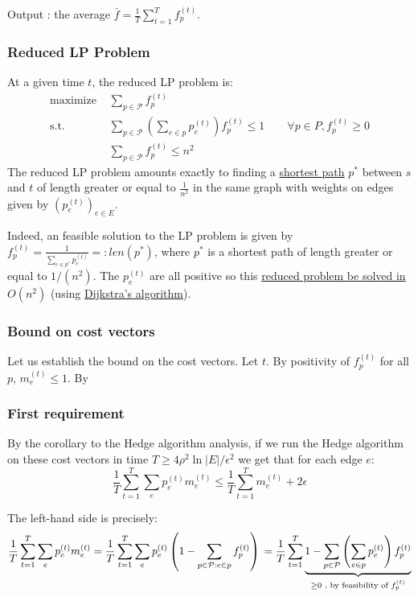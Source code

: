 \documentclass[a4paper, 11pt]{article}
\begin{document}
Output : the average $\bar{f} = \frac{1}{T}\sum_{t = 1}^{T}f_p^{(t)}$.

\subsubsection*{Reduced LP Problem}

At a given time $t$, the reduced LP problem is:
\begin{align*}
    \text{maximize }&\sum_{p \in \mathcal{P}} f_p^{(t)} \\
    \text{s.t. }&\sum_{p \in \mathcal{P}} \left(\sum_{e \in p} p_e^{(t)}\right)f_p^{(t)} \le 1 \qquad
\forall p \in P, f_p^{(t)} \ge 0 \\
    &\sum_{p \in \mathcal{P}}f_p^{(t)} \le n^2
\end{align*}
The reduced LP problem amounts exactly to finding a \ul{shortest path} $p^*$ between $s$ and $t$ of length greater or equal to $\frac{1}{n^2}$ in the same graph with weights on edges given by $(p_e^{(t)})_{e\in E}$.

Indeed, an feasible solution to the LP problem is given by $f_{p}^{(t)} = \frac{1}{\sum_{e \in p^*} p_e^{(t)}} =: len(p^*)$, where $p^*$ is a shortest path of length greater or equal to $1/(n^2)$. The $p_e^{(t)}$ are all positive so this \ul{reduced problem be solved in $O(n^2)$} (using \ul{Dijkstra's algorithm}).

\subsubsection*{Bound on cost vectors}

Let us establish the bound on the cost vectors. Let $t$. By positivity of $f_p^{(t)}$ for all $p$, $m_e^{(t)} \le 1$. By 



\subsubsection*{First requirement}

By the corollary to the Hedge algorithm analysis, if we run the Hedge algorithm on these cost vectors in time $T \ge 4\rho^2\ln{|E|}/\epsilon^2$ we get that for each edge $e$:
$$\frac{1}{T}\sum_{t = 1}^{T}\sum_e p_e^{(t)}m_e^{(t)} \leq \frac{1}{T}\sum_{t=1}^{T}m_e^{(t)}+2\epsilon$$

The left-hand side is precisely:
$$
\frac{1}{T}\sum_{t = 1}^{T}\sum_e p_e^{(t)}m_e^{(t)}
    = \frac{1}{T}\sum_{t = 1}^{T}\sum_e p_e^{(t)}\left(1 - \sum_{p\in\mathcal{P} : e \in p}f_p^{(t)}\right) \\
    = \frac{1}{T}\sum_{t = 1}^{T}\underbrace{1 - \sum_{p \in \mathcal{P}} \left(\sum_{e \in p} p_e^{(t)}\right)f_p^{(t)}}_{\ge 0\text{ , by feasibility of } f_p^{(t)}}$$
\end{document}
